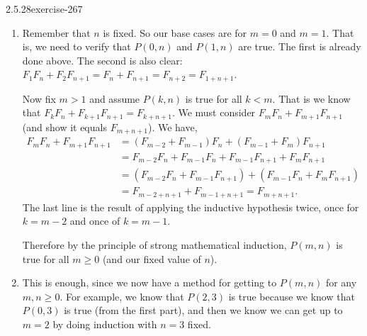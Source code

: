 \documentclass[twoside,11pt,]{book}
\numberwithin{equation}{chapter}
\newcommand{\lt}{<}
\newcommand{\gt}{>}
\newcommand{\amp}{&}
\begin{document}
\begin{divisionsolution}{2.5.28}{}{exercise-267}
\begin{enumerate}[label=(\alph*)]
\item\hypertarget{li-1982}{}\hypertarget{p-3709}{}%
Remember that \(n\) is fixed. So our base cases are for \(m = 0\) and \(m = 1\). That is, we need to verify that \(P(0,n)\) and \(P(1,n)\) are true. The first is already done above. The second is also clear: \(F_1F_n + F_2F_{n+1} = F_n + F_{n+1} = F_{n+2} = F_{1 + n + 1}\).%
\par
\hypertarget{p-3710}{}%
Now fix \(m \gt 1\) and assume \(P(k,n)\) is true for all \(k \lt m\). That is we know that \(F_kF_n + F_{k+1}F_{n+1} = F_{k+n+1}\). We must consider \(F_{m}F_n + F_{m+1}F_{n+1}\) (and show it equals \(F_{m+n+1}\)). We have,%
\begin{align*}
F_{m}F_n + F_{m+1}F_{n+1} \amp = (F_{m-2} + F_{m-1})F_n + (F_{m-1} + F_{m})F_{n+1}\\
\amp = F_{m-2}F_n + F_{m-1}F_n + F_{m-1}F_{n+1} + F_{m}F_{n+1}\\
\amp = (F_{m-2}F_n + F_{m-1}F_{n+1}) + (F_{m-1}F_n + F_{m}F_{n+1})\\
\amp = F_{m-2 + n + 1} + F_{m-1 + n + 1} = F_{m + n + 1}\text{.}
\end{align*}
The last line is the result of applying the inductive hypothesis twice, once for \(k = m-2\) and once of \(k = m-1\).%
\par
\hypertarget{p-3711}{}%
Therefore by the principle of strong mathematical induction, \(P(m,n)\) is true for all \(m \ge 0\) (and our fixed value of \(n\)).%
\item\hypertarget{li-1983}{}\hypertarget{p-3712}{}%
This is enough, since we now have a method for getting to \(P(m,n)\) for any \(m,n \ge 0\). For example, we know that \(P(2,3)\) is true because we know that \(P(0,3)\) is true (from the first part), and then we know we can get up to \(m = 2\) by doing induction with \(n = 3\) fixed.%
\end{enumerate}
%
\end{divisionsolution}%
\end{document}

